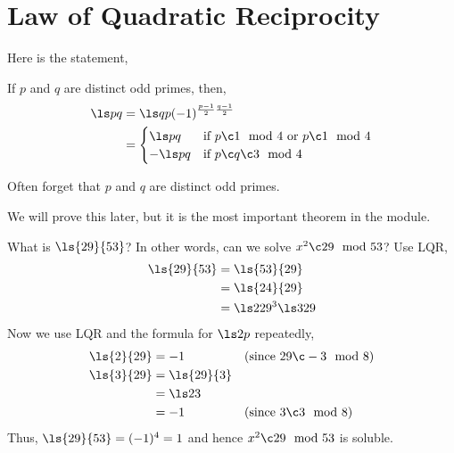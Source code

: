 
\section{Law of Quadratic Reciprocity}
Here is the statement,
\begin{nthm}[LQR]
  If $p$ and $q$ are distinct odd primes, then,
  \begin{align*}
    \ls p q &= \ls q p (-1)^{\frac{p-1}{2}\frac{q-1}{2}}\\
    &= \begin{cases}
      \ls p q & \text{if } p \c 1 \mod 4 \text{ or } p \c 1 \mod 4\\
      -\ls p q & \text{if } p \c q \c 3 \mod 4
  \end{cases}
  \end{align*}
\end{nthm}

\begin{remark}
   Often forget that $p$ and $q$ are distinct odd primes.
\end{remark}

We will prove this later, but it is the most important theorem in the module.

\begin{eg}
  What is $\ls{29}{53}$? In other words, can we solve $x^2 \c 29 \mod 53$? Use LQR,
  \begin{align*}
    \ls{29}{53} &= \ls{53}{29} \\
    &= \ls{24}{29}\\
    &= \ls 2 {29} ^3 \ls 3 {29}
  \end{align*}
  Now we use LQR and the formula for $\ls 2 p$ repeatedly,
  \begin{align*}
    \ls{2}{29} &= -1 && (\text{since $29 \c -3 \mod 8$})\\
    \ls{3}{29} &= \ls{29}{3} \\
    &= \ls 2 3\\
    &= -1 && (\text{since $3 \c 3 \mod 8$})
  \end{align*}
  Thus, $\ls{29}{53} = (-1)^4 = 1$ and hence $x^2 \c 29 \mod 53$ is soluble.
\end{eg}
